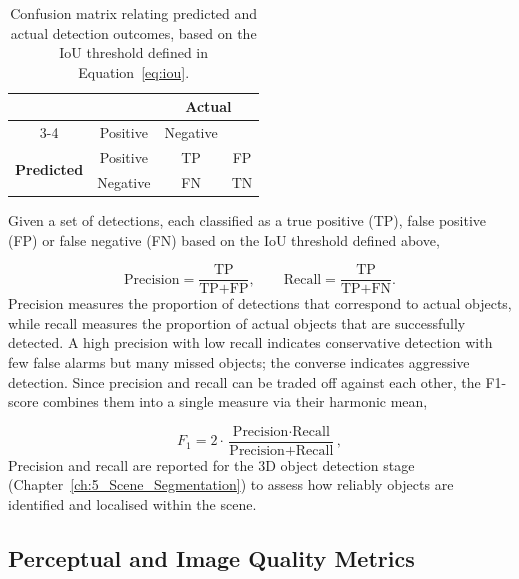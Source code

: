 \begin{table}[h]
    \centering
    \caption[Confusion matrix for detection evaluation]{Confusion matrix relating predicted and actual detection outcomes, based on the \gls{IoU} threshold defined in Equation~\ref{eq:iou}.}
    \label{tab:bg_confusion_matrix}
    \renewcommand{\arraystretch}{1.3}
    \begin{tabular}{c|c|c|c|}
        \multicolumn{2}{c|}{} & \multicolumn{2}{c|}{\textbf{Actual}} \\
        \cline{3-4}
        \multicolumn{2}{c|}{} & Positive & Negative \\
        \hline
        \multirow{2}{*}{\textbf{Predicted}} & Positive & TP & FP \\
        \cline{2-4}
        & Negative & FN & TN \\
        \hline
    \end{tabular}
\end{table}

Given a set of detections, each classified as a true positive (TP), false positive (FP) or false negative (FN) based on the \gls{IoU} threshold defined above,

\begin{equation}
\label{eq:precision_recall}
\text{Precision} = \frac{\text{TP}}{\text{TP} + \text{FP}}, \qquad
\text{Recall} = \frac{\text{TP}}{\text{TP} + \text{FN}} .
\end{equation}
Precision measures the proportion of detections that correspond to actual objects, while recall measures the proportion of actual objects that are successfully detected. A high precision with low recall indicates conservative detection with few false alarms but many missed objects; the converse indicates aggressive detection. Since precision and recall can be traded off against each other, the F1-score combines them into a single measure via their harmonic mean,

\begin{equation}
\label{eq:f_score}
F_1 = 2 \cdot \frac{\text{Precision} \cdot \text{Recall}}{\text{Precision} + \text{Recall}} ,
\end{equation}
Precision and recall are reported for the 3D object detection stage (Chapter~\ref{ch:5_Scene_Segmentation}) to assess how reliably objects are identified and localised within the scene.



\subsection{Perceptual and Image Quality Metrics}
\label{sec:bg_metrics_perceptual}

